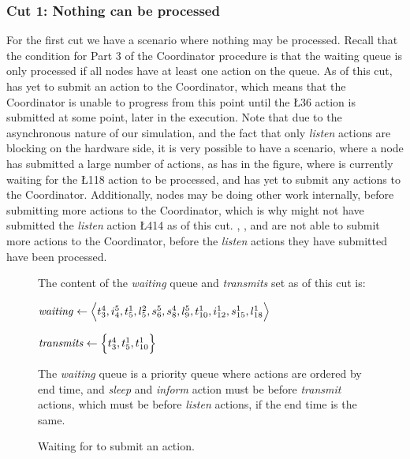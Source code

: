 \subsubsection{Cut 1: Nothing can be processed}
For the first cut we have a scenario where nothing may be processed. Recall that the condition for Part 3 of
the Coordinator procedure is that the waiting queue is only processed if all nodes have at least one action on
the queue. As of this cut,  has yet to submit an action to the Coordinator, which means that the
Coordinator is unable to progress from this point until the \L{3}{6} action is submitted at some point, later
in the execution. Note that due to the asynchronous nature of our simulation, and the fact that only
\textit{listen} actions are blocking on the hardware side, it is very possible to have a scenario, where a
node has submitted a large number of actions, as  has in the figure, where  is currently
waiting for the \L{1}{18} action to be processed, and  has yet to submit any actions to the
Coordinator. Additionally, nodes may be doing other work internally, before submitting more actions to the
Coordinator, which is why  might not have submitted the \textit{listen} action \L{4}{14} as of this
cut. , , and  are not able to submit more actions to the Coordinator, before the
\textit{listen} actions they have submitted have been processed.

\begin{figure}[H]
    \caption{Waiting for  to submit an action.}\label{tikz:coordinatormsc1}
     \par

    \begin{minipage}[h]{14.5cm}
        The content of the \textit{waiting} queue and \textit{transmits} set as of this cut is: \smallbreak

        $\mathit{waiting} \leftarrow \Big\langle t^{4}_{3}, i^{5}_{4}, t^{1}_{5}, l^{2}_{5}, s^{5}_{6}, s^{4}_{8},
            l^{5}_{9}, t^{1}_{10}, i^{1}_{12}, s^{1}_{15}, l^{1}_{18} \Big\rangle$

        $\mathit{transmits} \leftarrow \Big\{ t^{4}_{3}, t^{1}_{5}, t^{1}_{10} \Big\}$ \smallbreak

        The \textit{waiting} queue is a priority queue where actions are ordered by end time, and
        \textit{sleep} and \textit{inform} action must be before \textit{transmit} actions, which must be
        before \textit{listen} actions, if the end time is the same.
    \end{minipage}
\end{figure}

